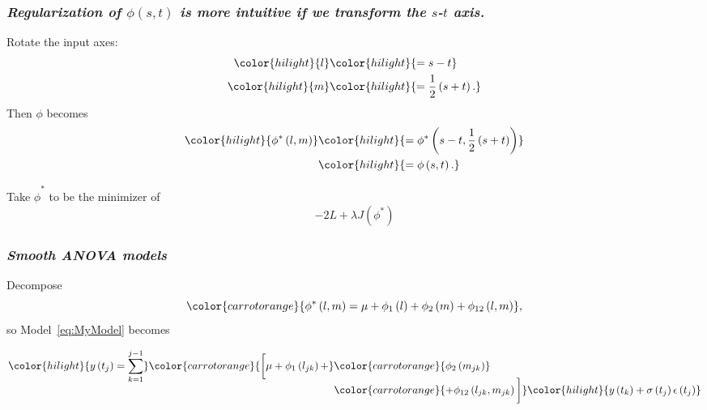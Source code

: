 \documentclass[12pt]{beamer}
\newcommand{\newmaththought}[1]{{ \color{hilight} {#1}}}
\newcommand{\carrotorangemath}[1]{{ \color{carrotorange} {#1}}}
\begin{document}
\begin{frame}
\frametitle{\emph{Regularization of $\phi\left(s,t\right)$ is more intuitive if we transform the $s$-$t$ axis. }}
Rotate the input axes:
\begin{align*}
\newmaththought{l} &\newmaththought{= s-t} \\
\newmaththought{m} &\newmaththought{= \frac{1}{2}\left(s+t\right).}
\end{align*}
\noindent
Then $\phi$ becomes
\begin{align*}
\newmaththought{\phi^*\left(l,m\right)} &\newmaththought{= \phi^*\left(s-t, \frac{1}{2}\left(s+t\right)\right)}\\
 &\newmaththought{= \phi\left(s,t\right).}
\end{align*}

Take $\hat{\phi}^*$ to be the minimizer of 
\[
-2L + \lambda J\left(\phi^*\right)
\]

\end{frame}







\begin{frame}
\frametitle{\emph{Smooth ANOVA models}}
Decompose
\begin{equation} \label{eq:SANOVA-model}
\carrotorangemath{
\phi^*\left(l,m\right) = \mu + \phi_1\left(l\right) + \phi_2\left(m\right) + \phi_{12}\left(l,m\right)},
\end{equation} 
so Model~\ref{eq:MyModel} becomes

\begin{align}  
\begin{split} \label{eq:expanded-ps-anova-vc-model}
\newmaththought{ y\left(t_j \right)  = \sum_{k=1}^{j-1}}\carrotorangemath{ \bigg[\mu + \phi_1\left(l_{jk}\right) + } &\carrotorangemath{\phi_2\left(m_{jk}\right)} \bigg.\\[-2ex]
\bigg. &\carrotorangemath{+ \phi_{12}\left(l_{jk},m_{jk}\right) \bigg]}\newmaththought{y\left(t_k\right)+ \sigma\left(t_j\right)\epsilon\left({t_j}\right)}
\end{split}
\end{align}
\end{frame}
\end{document}
